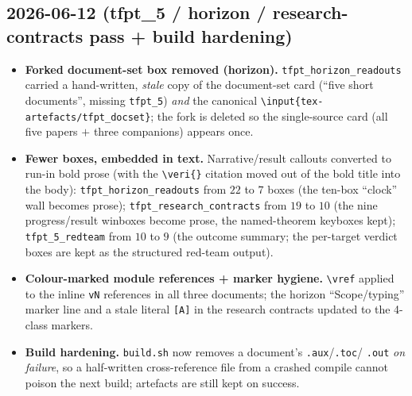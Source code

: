 \subsection*{2026-06-12 (tfpt\_5 / horizon / research-contracts pass + build hardening)}
\begin{itemize}
\item \textbf{Forked document-set box removed (horizon).} \texttt{tfpt\_horizon\_readouts} carried a
  hand-written, \emph{stale} copy of the document-set card (``five short documents'', missing
  \texttt{tfpt\_5}) \emph{and} the canonical \texttt{\textbackslash input\{tex-artefacts/tfpt\_docset\}};
  the fork is deleted so the single-source card (all five papers $+$ three companions) appears once.
\item \textbf{Fewer boxes, embedded in text.} Narrative/result callouts converted to run-in bold prose
  (with the \texttt{\textbackslash veri\{\}} citation moved out of the bold title into the body):
  \texttt{tfpt\_horizon\_readouts} from $22$ to $7$ boxes (the ten-box ``clock'' wall becomes prose);
  \texttt{tfpt\_research\_contracts} from $19$ to $10$ (the nine progress/result winboxes become prose,
  the named-theorem keyboxes kept); \texttt{tfpt\_5\_redteam} from $10$ to $9$ (the outcome summary; the
  per-target verdict boxes are kept as the structured red-team output).
\item \textbf{Colour-marked module references + marker hygiene.} \texttt{\textbackslash vref} applied to
  the inline \texttt{vN} references in all three documents; the horizon ``Scope/typing'' marker line and a
  stale literal \texttt{[A]} in the research contracts updated to the 4-class markers.
\item \textbf{Build hardening.} \texttt{build.sh} now removes a document's \texttt{.aux}/\texttt{.toc}/%
  \texttt{.out} \emph{on failure}, so a half-written cross-reference file from a crashed compile cannot
  poison the next build; artefacts are still kept on success.
\end{itemize}

